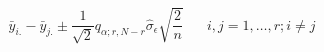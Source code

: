 

\[
\bar{y}_{i.} - \bar{y}_{j.} \pm \frac{1}{\sqrt{2}} q_{\alpha;r,N-r} \hat{\sigma}_{\epsilon} \sqrt{\frac{2}{n}}  \;\;\;\;\;\; i, j = 1, \ldots , r; i \ne j
\]


